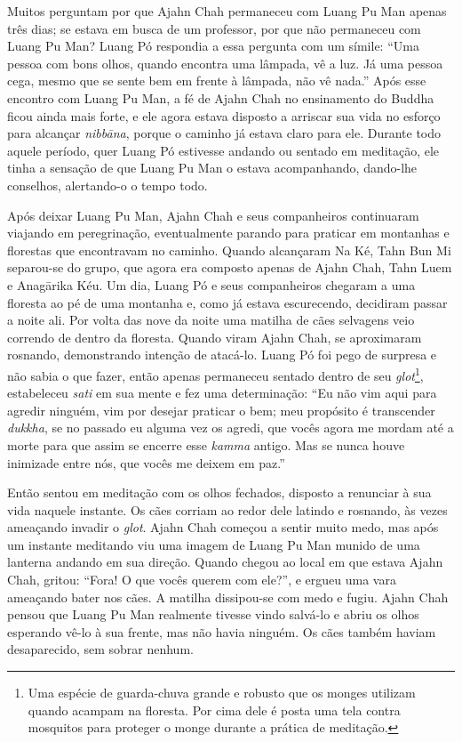 Muitos perguntam por que Ajahn Chah permaneceu com Luang Pu Man apenas
três dias; se estava em busca de um professor, por que não permaneceu
com Luang Pu Man? Luang Pó respondia a essa pergunta com um símile:
``Uma pessoa com bons olhos, quando encontra uma lâmpada, vê a luz. Já
uma pessoa cega, mesmo que se sente bem em frente à lâmpada, não vê
nada.'' Após esse encontro com Luang Pu Man, a fé de Ajahn Chah no
ensinamento do Buddha ficou ainda mais forte, e ele agora estava
disposto a arriscar sua vida no esforço para alcançar \emph{nibbāna},
porque o caminho já estava claro para ele. Durante todo aquele período,
quer Luang Pó estivesse andando ou sentado em meditação, ele tinha a
sensação de que Luang Pu Man o estava acompanhando, dando-lhe conselhos,
alertando-o o tempo todo.

Após deixar Luang Pu Man, Ajahn Chah e seus companheiros continuaram
viajando em peregrinação, eventualmente parando para praticar em
montanhas e florestas que encontravam no caminho. Quando alcançaram Na
Ké, Tahn Bun Mi separou-se do grupo, que agora era composto apenas de
Ajahn Chah, Tahn Luem e Anagārika Kéu. Um dia, Luang Pó e seus
companheiros chegaram a uma floresta ao pé de uma montanha e, como já
estava escurecendo, decidiram passar a noite ali. Por volta das nove da
noite uma matilha de cães selvagens veio correndo de dentro da floresta.
Quando viram Ajahn Chah, se aproximaram rosnando, demonstrando intenção
de atacá-lo. Luang Pó foi pego de surpresa e não sabia o que fazer,
então apenas permaneceu sentado dentro de seu \emph{glot}\footnote{Uma
  espécie de guarda-chuva grande e robusto que os monges utilizam quando
  acampam na floresta. Por cima dele é posta uma tela contra mosquitos
  para proteger o monge durante a prática de meditação.}, estabeleceu
\emph{sati} em sua mente e fez uma determinação: ``Eu não vim aqui para
agredir ninguém, vim por desejar praticar o bem; meu propósito é
transcender \emph{dukkha}, se no passado eu alguma vez os agredi, que
vocês agora me mordam até a morte para que assim se encerre esse
\emph{kamma} antigo. Mas se nunca houve inimizade entre nós, que vocês
me deixem em paz.''

Então sentou em meditação com os olhos fechados, disposto a renunciar à
sua vida naquele instante. Os cães corriam ao redor dele latindo e
rosnando, às vezes ameaçando invadir o \emph{glot}. Ajahn Chah começou a
sentir muito medo, mas após um instante meditando viu uma imagem de
Luang Pu Man munido de uma lanterna andando em sua direção. Quando
chegou ao local em que estava Ajahn Chah, gritou: ``Fora! O que vocês
querem com ele?'', e ergueu uma vara ameaçando bater nos cães. A matilha
dissipou-se com medo e fugiu. Ajahn Chah pensou que Luang Pu Man
realmente tivesse vindo salvá-lo e abriu os olhos esperando vê-lo à sua
frente, mas não havia ninguém. Os cães também haviam desaparecido, sem
sobrar nenhum.

